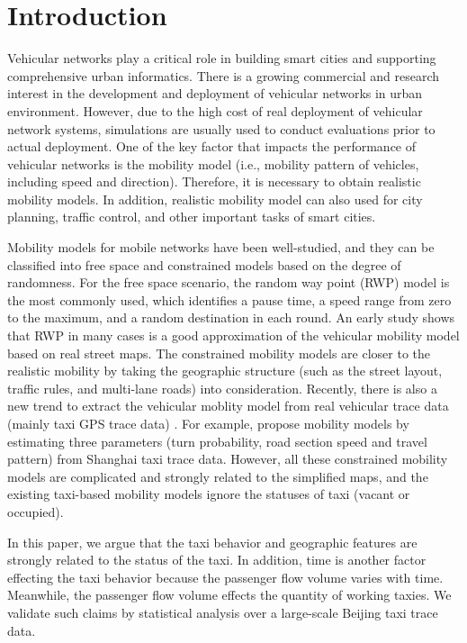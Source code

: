 \section{Introduction}
\label{section_introduction}

Vehicular networks play a critical role in building smart cities and supporting comprehensive urban informatics. There is a growing commercial and research interest in the development and deployment of vehicular networks in urban environment. However, due to the high cost of real deployment of vehicular network systems, simulations are usually used to conduct evaluations prior to actual deployment. One of the key factor that impacts the performance of vehicular networks is the mobility model (i.e., mobility pattern of vehicles, including speed and direction). Therefore, it is necessary to obtain realistic mobility models. In addition, realistic mobility model can also used for city planning, traffic control, and other important tasks of smart cities.

Mobility models for mobile networks \cite{LuChen-104,AhmedKarmakar-106} have been well-studied, and they can be classified into free space and constrained models based on the degree of randomness.
For the free space scenario, the random way point (RWP) model \cite{broch1998performance} is the most commonly used, which identifies a pause time, a speed range from zero to the maximum, and a random destination in each round. An early study \cite{SahaJohnson-91} shows that RWP in many cases is a good approximation of the vehicular mobility model based on real street maps. The constrained mobility models \cite{SahaJohnson-91,MartinezCano-87,ChoffnesBustamante-93}  are closer to the realistic mobility by taking the geographic structure (such as the street layout, traffic rules, and multi-lane roads) into consideration. Recently, there is also a new trend to extract the vehicular moblity model from real vehicular trace data (mainly taxi GPS trace data) \cite{KimKotz-99,HuangZhu-88}. For example, \cite{HuangZhu-88} propose mobility models by estimating three parameters (turn probability, road section speed and travel pattern) from Shanghai taxi trace data. However, all these constrained mobility models are complicated and strongly related to the simplified maps, and the existing taxi-based mobility models ignore the statuses of taxi (vacant or occupied).

In this paper, we argue that the taxi behavior and geographic features are strongly related to the status of the taxi. In addition, time is another factor effecting the taxi behavior because the passenger flow volume varies with time. Meanwhile, the passenger flow volume effects the quantity of working taxies. We validate such claims by statistical analysis over a large-scale Beijing taxi trace data. 


